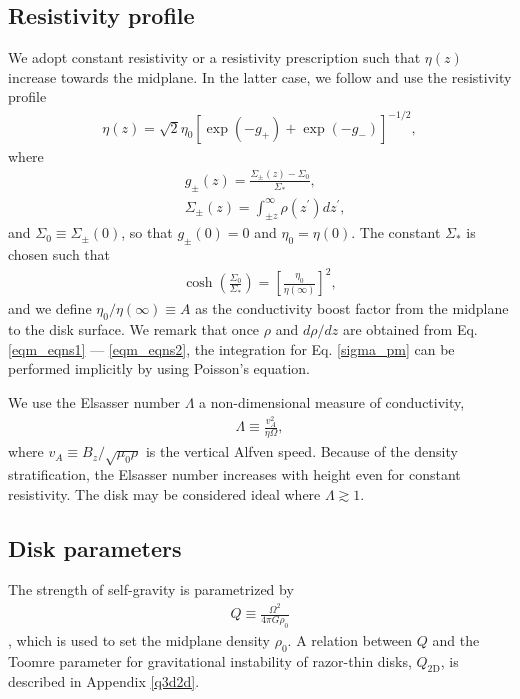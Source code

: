 \subsection{Resistivity profile}\label{resis_profile}
We adopt constant resistivity or a 
resistivity prescription such that $\eta(z)$ increase towards the
midplane. In the latter case, we follow \cite{fleming03} and use 
the resistivity profile 
\begin{align}
  \eta(z) =
  \sqrt{2}\eta_0\left[\exp{\left(-g_+\right)}+\exp{\left(-g_-\right)}\right]^{-1/2},  
\end{align}
where
\begin{align}
  &g_\pm(z) =  \frac{\Sigma_\pm(z)-\Sigma_0}{\Sigma_*}, \\
  &\Sigma_\pm(z) = \int_{\pm z}^\infty\rho(z^\prime)dz^\prime, \label{sigma_pm}
\end{align}
and $\Sigma_0\equiv\Sigma_{\pm}(0)$, so that $g_\pm(0)=0$ and $\eta_0 
= \eta(0)$. The constant $\Sigma_*$ is chosen such that 
\begin{align}
  \cosh{\left(\frac{\Sigma_0}{\Sigma_*}\right)} =
  \left[\frac{\eta_0}{\eta(\infty)}\right]^2,
\end{align}
and we define $\eta_0/\eta(\infty)\equiv A$ as the conductivity 
boost factor from the midplane to the disk surface. We remark that
once $\rho$ and $d\rho/dz$ are obtained from
Eq. \ref{eqm_eqns1} --- \ref{eqm_eqns2}, the integration for
Eq. \ref{sigma_pm} can be performed implicitly by using Poisson's 
equation. 

We use the Elsasser number $\Lambda$ a non-dimensional measure of
conductivity,
\begin{align} 
  \Lambda \equiv \frac{v_A^2}{\eta\Omega},
\end{align}
where $v_A \equiv B_z/\sqrt{\mu_0\rho}$ is the vertical Alfven speed. 
Because of the density stratification, the Elsasser number 
increases with height even for constant resistivity. The disk may be
considered ideal where $\Lambda \gtrsim 1$. 


\subsection{Disk parameters}
The strength of self-gravity is
parametrized by 
\begin{align}
  Q \equiv \frac{\Omega^2}{4\pi G\rho_0}
\end{align}
\citep{mamat10}, which is used to set the midplane density $\rho_0$. 
A relation between $Q$ and the Toomre parameter for gravitational
instability of razor-thin disks, $Q_\mathrm{2D}$, is described in
Appendix \ref{q3d2d}.  

